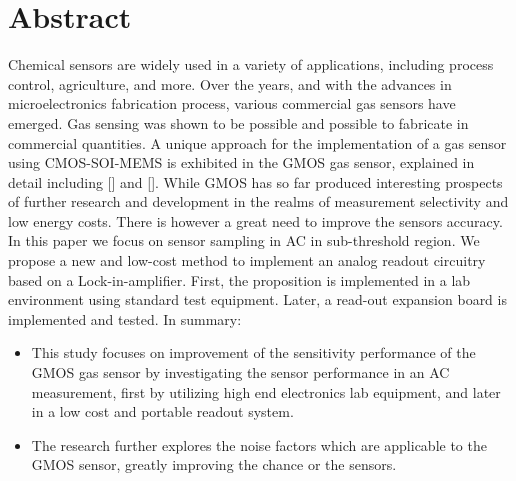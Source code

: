 \section{Abstract}
Chemical sensors are widely used in a variety of applications, including process control, agriculture, and more. Over the years, and with the advances in microelectronics fabrication process, various commercial gas sensors have emerged. Gas sensing was shown to be possible and possible to fabricate in commercial quantities. A unique approach for the implementation of a gas sensor using CMOS-SOI-MEMS is exhibited in the GMOS gas sensor, explained in detail including [] and [].
While GMOS has so far produced interesting prospects of further research and development in the realms of measurement selectivity and low energy costs. There is however a great need to improve the sensors accuracy. In this paper we focus on sensor sampling in AC in sub-threshold region. We propose a new and low-cost method to implement an analog readout circuitry based on a Lock-in-amplifier. First, the proposition is implemented in a lab environment using standard test equipment. Later, a read-out expansion board is implemented and tested. 
In summary:
\begin{itemize}
  \item This study focuses on improvement of the sensitivity performance of the GMOS gas sensor by investigating the sensor performance in an AC measurement, first by utilizing high end electronics lab equipment, and later in a low cost and portable readout system.
  \item The research further explores the noise factors which are applicable to the GMOS sensor, greatly improving the chance or the sensors.
\end{itemize}
